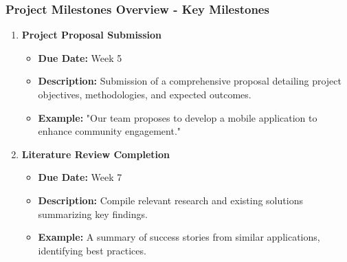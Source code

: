 \documentclass[aspectratio=169]{beamer}
\begin{document}
\begin{frame}[fragile]
  \frametitle{Project Milestones Overview - Key Milestones}
  \begin{enumerate}
    \item \textbf{Project Proposal Submission}
      \begin{itemize}
        \item \textbf{Due Date:} Week 5
        \item \textbf{Description:} Submission of a comprehensive proposal detailing project objectives, methodologies, and expected outcomes.
        \item \textbf{Example:} "Our team proposes to develop a mobile application to enhance community engagement."
      \end{itemize}
      
    \item \textbf{Literature Review Completion}
      \begin{itemize}
        \item \textbf{Due Date:} Week 7
        \item \textbf{Description:} Compile relevant research and existing solutions summarizing key findings.
        \item \textbf{Example:} A summary of success stories from similar applications, identifying best practices.
      \end{itemize}
  \end{enumerate}
\end{frame}
\end{document}
